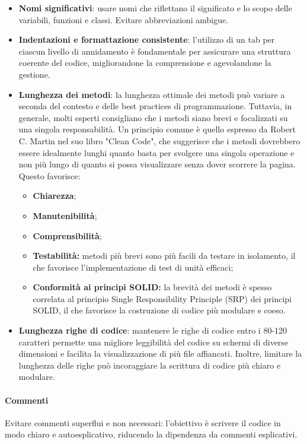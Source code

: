 \begin{itemize}
    \item \textbf{Nomi significativi}: usare nomi che riflettano il significato e lo scopo delle variabili, funzioni e classi. Evitare abbreviazioni ambigue.
    \item \textbf{Indentazioni e formattazione consistente}: l'utilizzo di un tab per ciascun livello di annidamento è fondamentale per assicurare una struttura coerente del codice, migliorandone la comprensione e agevolandone la gestione.
    \item \textbf{Lunghezza dei metodi}: la lunghezza ottimale dei metodi può variare a seconda del contesto e delle best practices di programmazione. Tuttavia, in generale, molti esperti consigliano che i metodi siano brevi e focalizzati su una singola responsabilità. Un principio comune è quello espresso da Robert C. Martin nel suo libro "Clean Code", che suggerisce che i metodi dovrebbero essere idealmente lunghi quanto basta per svolgere una singola operazione e non più lungo di quanto si possa visualizzare senza dover scorrere la pagina. \\
    Questo favorisce:
    \begin{itemize}
        \item \textbf{Chiarezza};
        \item \textbf{Manutenibilità};
        \item \textbf{Comprensibilità};
        \item \textbf{Testabilità:} metodi più brevi sono più facili da testare in isolamento, il che favorisce l'implementazione di test di unità efficaci;
        \item \textbf{Conformità ai principi SOLID:} la brevità dei metodi è spesso correlata al principio Single Responsibility Principle (SRP) dei principi SOLID, il che favorisce la costruzione di codice più modulare e coeso.
    \end{itemize} 
    \item \textbf{Lunghezza righe di codice}: mantenere le righe di codice entro i 80-120 caratteri permette una migliore leggibilità del codice su schermi di diverse dimensioni e facilita la visualizzazione di più file affiancati. Inoltre, limitare la lunghezza delle righe può incoraggiare la scrittura di codice più chiaro e modulare.
\end{itemize}

\paragraph{Commenti}
Evitare commenti superflui e non necessari: l'obiettivo è scrivere il codice in modo chiaro e autoesplicativo, riducendo la dipendenza da commenti esplicativi.

